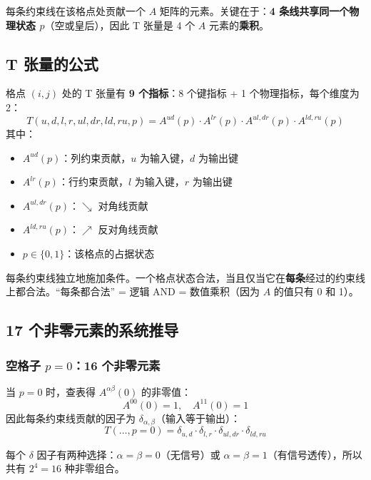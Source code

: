\documentclass[12pt,a4paper]{article}
\begin{document}
每条约束线在该格点处贡献一个 $A$ 矩阵的元素。关键在于：\textbf{4 条线共享同一个物理状态 $p$}（空或皇后），因此 T 张量是 4 个 $A$ 元素的\textbf{乘积}。

\subsection{T 张量的公式}

\begin{keybox}[核心公式：T 张量]
格点 $(i,j)$ 处的 T 张量有 \textbf{9 个指标}：8 个键指标 + 1 个物理指标，每个维度为 2：
\[
\boxed{
T(u, d, l, r, ul, dr, ld, ru, p) = A^{ud}(p) \cdot A^{lr}(p) \cdot A^{ul,dr}(p) \cdot A^{ld,ru}(p)
}
\]
其中：
\begin{itemize}
  \item $A^{ud}(p)$：列约束贡献，$u$ 为输入键，$d$ 为输出键
  \item $A^{lr}(p)$：行约束贡献，$l$ 为输入键，$r$ 为输出键
  \item $A^{ul,dr}(p)$：$\searrow$ 对角线贡献
  \item $A^{ld,ru}(p)$：$\nearrow$ 反对角线贡献
  \item $p \in \{0, 1\}$：该格点的占据状态
\end{itemize}
\end{keybox}

\begin{notebox}[为什么是乘积？]
每条约束线独立地施加条件。一个格点状态合法，当且仅当它在\textbf{每条}经过的约束线上都合法。``每条都合法'' = 逻辑 AND = 数值乘积（因为 $A$ 的值只有 0 和 1）。
\end{notebox}

\subsection{17 个非零元素的系统推导}

\subsubsection{空格子 $p = 0$：16 个非零元素}

当 $p = 0$ 时，查表得 $A^{\alpha\beta}(0)$ 的非零值：
\[
A^{00}(0) = 1, \quad A^{11}(0) = 1
\]
因此每条约束线贡献的因子为 $\delta_{\alpha,\beta}$（输入等于输出）：
\[
T(\ldots, p=0) = \delta_{u,d} \cdot \delta_{l,r} \cdot \delta_{ul,dr} \cdot \delta_{ld,ru}
\]

每个 $\delta$ 因子有两种选择：$\alpha = \beta = 0$（无信号）或 $\alpha = \beta = 1$（有信号透传），所以共有 $2^4 = 16$ 种非零组合。
\end{document}
